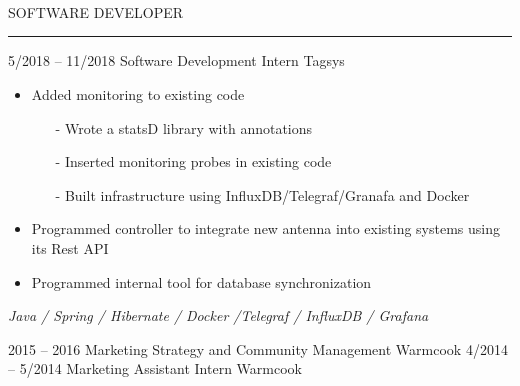 \documentclass[10pt]{cv}
\begin{document}
\begin{minipage}[t]{0.82\textwidth}
  \vspace{-\baselineskip}
  \vspace{4ex}
  \begin{center}
  {}\\[2ex]

  \\[1ex]


  \\[2ex]
  \LARGE{SOFTWARE DEVELOPER}
  \end{center}
\end{minipage}
\begin{minipage}[t]{0.18\textwidth}
  \vspace{-\baselineskip}
  \vspace{5mm}
  \rule{2.8cm}{3.6cm}
\end{minipage}


\vspace{2mm}

\begin{entrylist}
  \entry
    {5/2018 -- 11/2018}
    {Software Development Intern}
    {Tagsys}
    {\vspace{-1ex}
      \begin{itemize}
        \item Added monitoring to existing code
        \begin{itemize}
            \item[-] Wrote a statsD library with annotations
            \item[-] Inserted monitoring probes in existing code
            \item[-] Built infrastructure using InfluxDB/Telegraf/Granafa and Docker
          \end{itemize}
          \item Programmed controller to integrate new antenna into existing systems using its Rest API
          \item Programmed internal tool for database synchronization\\
      \end{itemize}
      \vspace{-1ex}
      \textit{Java / Spring / Hibernate / Docker /Telegraf / InfluxDB / Grafana}}
  \smallentry
    {2015 -- 2016}
    {Marketing Strategy and Community Management}
    {Warmcook}
  \smallentry
    {4/2014 -- 5/2014}
    {Marketing Assistant Intern}
    {Warmcook}
\end{entrylist}
\end{document}
